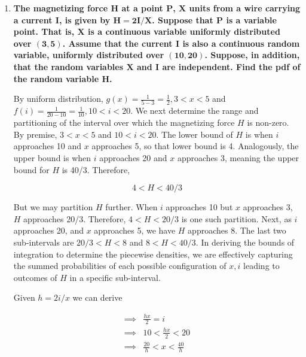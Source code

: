 \documentclass[10pt, oneside]{article}   	%
\theoremstyle{definition}
\begin{document}
\begin{enumerate}[label=6.\arabic*]
\begin{proof}
($\impliedby$) By premise, $g(x | y) = g(x)$ and $h(y | x) = h(y)$. By definition and premise, $g(x | y) = \frac{f(x,y)}{h(y)} = g(x)$ and $h(y | x) = \frac{f(x,y)}{g(x)} = h(y)$, which both imply $f(x,y) = g(x) h(y)$, or the independence of $X,Y$.

\end{proof}

\item  \begin{tcolorbox}[
  colback=Cerulean!5!white,
  colframe=Cerulean!75!black]
\textbf{The magnetizing force $\bm{H}$ at a point $\bm{P}$, $\bm{X}$ units from a wire carrying a current $\bm{I}$, is given by $\bm{H = 2I / X}$. Suppose that $\bm{P}$ is a variable point. That is, $\bm{X}$ is a continuous variable uniformly distributed over $\bm{(3,5)}$. Assume that the current $\bm{I}$ is also a continuous random variable, uniformly distributed over $\bm{(10,20)}$. Suppose, in addition, that the random variables $\bm{X}$ and $\bm{I}$ are independent. Find the pdf of the random variable $\bm{H}$.}
\end{tcolorbox}

By uniform distribution, $g(x) = \frac{1}{5 - 3} = \frac{1}{2}, 3 < x < 5$ and $f(i) = \frac{1}{20-10} = \frac{1}{10}, 10 < i < 20$. We next determine the range and partitioning of the interval over which the magnetizing force $H$ is non-zero. By premise, $3 < x < 5$ and $10 < i < 20$. The lower bound of $H$ is when $i$ approaches 10 and $x$ approaches 5, so that lower bound is 4. Analogously, the upper bound is when $i$ approaches 20 and $x$ approaches 3, meaning the upper bound for $H$ is 40/3. Therefore,

\[ 4 < H < 40/3 \]

But we may partition $H$ further. When $i$ approaches 10 but $x$ approaches 3, $H$ approaches 20/3. Therefore, $4 < H < 20/3$ is one such partition. Next, as $i$ approaches 20, and $x$ approaches 5, we have $H$ approaches 8. The last two sub-intervals are $20/3 < H < 8$ and $8 < H < 40/3$. In deriving the bounds of integration to determine the piecewise densities, we are effectively capturing the summed probabilities of each possible configuration of $x, i$ leading to outcomes of $H$ in a specific sub-interval.

Given $h = 2i/x$ we can derive

\begin{align*}
\implies& \frac{hx}{2} = i \\
\implies& 10 < \frac{hx}{2} < 20 \\
\implies& \frac{20}{h} < x < \frac{40}{h}
\end{align*}


\end{enumerate}
\end{document}
